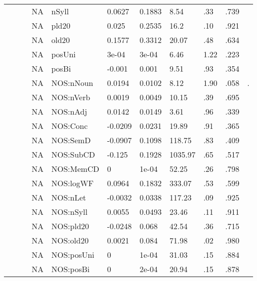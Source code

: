\begin{table}[ht]
\begin{tabular}{lllllllllll}
   &  &  & NA & nSyll & 0.0627 & 0.1883 & 8.54 & .33 & .739 &   \\ 
   &  &  & NA & pld20 & 0.025 & 0.2535 & 16.2 & .10 & .921 &   \\ 
   &  &  & NA & old20 & 0.1577 & 0.3312 & 20.07 & .48 & .634 &   \\ 
   &  &  & NA & posUni & 3e-04 & 3e-04 & 6.46 & 1.22 & .223 &   \\ 
   &  &  & NA & posBi & -0.001 & 0.001 & 9.51 & .93 & .354 &   \\ 
   &  &  & NA & NOS:nNoun & 0.0194 & 0.0102 & 8.12 & 1.90 & .058 & . \\ 
   &  &  & NA & NOS:nVerb & 0.0019 & 0.0049 & 10.15 & .39 & .695 &   \\ 
   &  &  & NA & NOS:nAdj & 0.0142 & 0.0149 & 3.61 & .96 & .339 &   \\ 
   &  &  & NA & NOS:Conc & -0.0209 & 0.0231 & 19.89 & .91 & .365 &   \\ 
   &  &  & NA & NOS:SemD & -0.0907 & 0.1098 & 118.75 & .83 & .409 &   \\ 
   &  &  & NA & NOS:SubCD & -0.125 & 0.1928 & 1035.97 & .65 & .517 &   \\ 
   &  &  & NA & NOS:MemCD & 0 & 1e-04 & 52.25 & .26 & .798 &   \\ 
   &  &  & NA & NOS:logWF & 0.0964 & 0.1832 & 333.07 & .53 & .599 &   \\ 
   &  &  & NA & NOS:nLet & -0.0032 & 0.0338 & 117.23 & .09 & .925 &   \\ 
   &  &  & NA & NOS:nSyll & 0.0055 & 0.0493 & 23.46 & .11 & .911 &   \\ 
   &  &  & NA & NOS:pld20 & -0.0248 & 0.068 & 42.54 & .36 & .715 &   \\ 
   &  &  & NA & NOS:old20 & 0.0021 & 0.084 & 71.98 & .02 & .980 &   \\ 
   &  &  & NA & NOS:posUni & 0 & 1e-04 & 31.03 & .15 & .884 &   \\ 
   &  &  & NA & NOS:posBi & 0 & 2e-04 & 20.94 & .15 & .878 &   \\ 
   \hline
\end{tabular}
\endgroup
\end{table}

